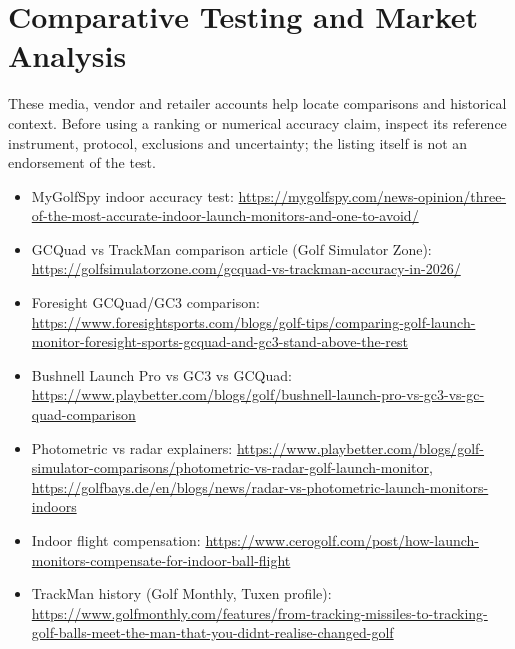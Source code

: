 \section{Comparative Testing and Market Analysis}
These media, vendor and retailer accounts help locate comparisons and
historical context. Before using a ranking or numerical accuracy claim,
inspect its reference instrument, protocol, exclusions and uncertainty;
the listing itself is not an endorsement of the test.
\begin{itemize}\small
\item MyGolfSpy indoor accuracy test:
  \url{https://mygolfspy.com/news-opinion/three-of-the-most-accurate-indoor-launch-monitors-and-one-to-avoid/}
\item GCQuad vs TrackMan comparison article (Golf Simulator Zone):
  \url{https://golfsimulatorzone.com/gcquad-vs-trackman-accuracy-in-2026/}
\item Foresight GCQuad/GC3 comparison:
  \url{https://www.foresightsports.com/blogs/golf-tips/comparing-golf-launch-monitor-foresight-sports-gcquad-and-gc3-stand-above-the-rest}
\item Bushnell Launch Pro vs GC3 vs GCQuad:
  \url{https://www.playbetter.com/blogs/golf/bushnell-launch-pro-vs-gc3-vs-gc-quad-comparison}
\item Photometric vs radar explainers:
  \url{https://www.playbetter.com/blogs/golf-simulator-comparisons/photometric-vs-radar-golf-launch-monitor},
  \url{https://golfbays.de/en/blogs/news/radar-vs-photometric-launch-monitors-indoors}
\item Indoor flight compensation:
  \url{https://www.cerogolf.com/post/how-launch-monitors-compensate-for-indoor-ball-flight}
\item TrackMan history (Golf Monthly, Tuxen profile):
  \url{https://www.golfmonthly.com/features/from-tracking-missiles-to-tracking-golf-balls-meet-the-man-that-you-didnt-realise-changed-golf}
\end{itemize}
\par
\endgroup

